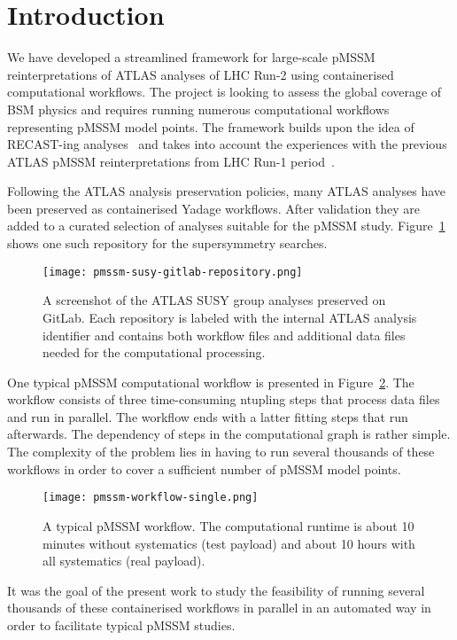 \section{Introduction}\label{sec:intro}

We have developed a streamlined framework for large-scale pMSSM reinterpretations of ATLAS analyses of LHC Run-2 using containerised computational workflows.
The project is looking to assess the global coverage of BSM physics and requires running numerous computational workflows representing pMSSM model points.
The framework builds upon the idea of RECAST-ing analyses~\cite{ref:arXiv:1010.2506} and takes into account the experiences with the previous ATLAS pMSSM reinterpretations from LHC Run-1 period~\cite{ref:arXiv:1508.06608}.

Following the ATLAS analysis preservation policies, many ATLAS analyses have been preserved as containerised Yadage workflows.
After validation they are added to a curated selection of analyses suitable for the pMSSM study.
Figure~\ref{fig:pmssmgitlab} shows one such repository for the supersymmetry searches.

\begin{figure}
\centering
\texttt{[image: pmssm-susy-gitlab-repository.png]}
\caption{A screenshot of the ATLAS SUSY group analyses preserved on GitLab. Each repository is labeled with the internal ATLAS analysis identifier and contains both workflow files and additional data files needed for the computational processing.}
\label{fig:pmssmgitlab}
\end{figure}

One typical pMSSM computational workflow is presented in Figure~\ref{fig:dag}.
The workflow consists of three time-consuming ntupling steps that process data files and run in parallel.
The workflow ends with a latter fitting steps that run afterwards.
The dependency of steps in the computational graph is rather simple.
The complexity of the problem lies in having to run several thousands of these workflows in order to cover a sufficient number of pMSSM model points.

\begin{figure}
\centering
\texttt{[image: pmssm-workflow-single.png]}
\caption{A typical pMSSM workflow. The computational runtime is about 10 minutes without systematics (test payload) and about 10 hours with all systematics (real payload).}
\label{fig:dag}
\end{figure}

It was the goal of the present work to study the feasibility of running several thousands of these containerised workflows in parallel in an automated way in order to facilitate typical pMSSM studies.
